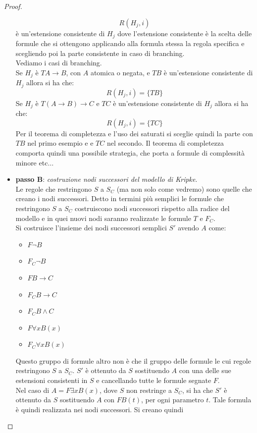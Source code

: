 \documentclass[a4paper,12pt, oneside]{book}
\begin{document}
\begin{proof}
\begin{itemize}
    \[R(H_j,i)\]
    è un'estensione consistente di $H_j$ dove l'estensione consistente è la
    scelta delle formule che si ottengono applicando alla formula stessa la
    regola specifica e scegliendo poi la parte consistente in caso di
    branching.\\
    Vediamo i casi di branching.\\
    Se $H_j$ è $TA\to B$, con $A$ atomica o negata, e $TB$ è
    un'estensione consistente di $H_j$ allora si ha che:
    \[R(H_j,i)=\{TB\}\]
    Se $H_j$ è $T(A\to B)\to C$ e $TC$ è
    un'estensione consistente di $H_j$ allora si ha che:
    \[R(H_j,i)=\{TC\}\]
    Per il teorema di completezza e l'uso dei saturati si sceglie quindi la
    parte con $TB$ nel primo esempio e e $TC$ nel secondo. Il teorema di
    completezza comporta quindi una possibile strategia, che porta a formule di
    complessità minore etc$\ldots$ 
    \item \textbf{passo B}: \textit{costruzione nodi successori del modello di
      Kripke}.\\
    Le regole che restringono $S$ a $S_C$ (ma non solo come vedremo) sono quelle
    che creano i nodi successori. Detto in termini più semplici le formule che
    restringono $S$ a $S_C$ costruiscono nodi successori rispetto alla radice
    del modello e in quei nuovi nodi saranno realizzate le formule $T$ e
    $F_C$.\\
    Si costruisce l'insieme dei nodi successori semplici $S'$ avendo $A$ come:
    \begin{itemize}
      \item $F\neg B$
      \item $F_C\neg B$
      \item $FB\to C$
      \item $F_CB\to C$
      \item $F_CB\land C$
      \item $F\forall xB(x)$
      \item $F_C\forall xB(x)$
    \end{itemize}
    Questo gruppo di formule altro non è che il gruppo delle formule le cui
    regole restringono $S$ a $S_C$. $S'$ è ottenuto da $S$ sostituendo $A$ con
    una delle sue estensioni consistenti in $S$ e cancellando tutte le formule
    segnate $F$. \\
    Nel caso di $A=F\exists xB(x)$, dove $S$ non restringe a $S_C$, si ha che
    $S'$ è ottenuto da $S$ sostituendo $A$ con $FB(t)$, per ogni parametro
    $t$. Tale formula è quindi realizzata nei nodi successori. Si creano quindi

\end{itemize}
\end{proof}
\end{document}
